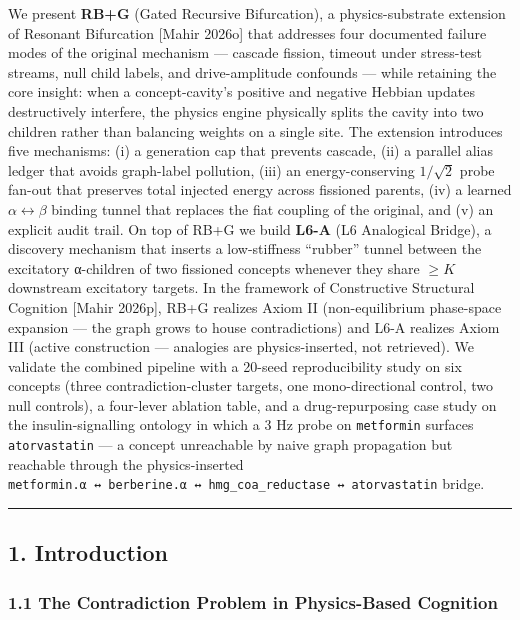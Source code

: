 \documentclass[
  11pt,
  a4paper,
]{article}
\begin{document}
We present \textbf{RB+G} (Gated Recursive Bifurcation), a
physics-substrate extension of Resonant Bifurcation {[}Mahir 2026o{]}
that addresses four documented failure modes of the original mechanism
--- cascade fission, timeout under stress-test streams, null child
labels, and drive-amplitude confounds --- while retaining the core
insight: when a concept-cavity's positive and negative Hebbian updates
destructively interfere, the physics engine physically splits the cavity
into two children rather than balancing weights on a single site. The
extension introduces five mechanisms: (i) a generation cap that prevents
cascade, (ii) a parallel alias ledger that avoids graph-label pollution,
(iii) an energy-conserving \(1/\sqrt{2}\) probe fan-out that preserves
total injected energy across fissioned parents, (iv) a learned
\(\alpha \leftrightarrow \beta\) binding tunnel that replaces the fiat
coupling of the original, and (v) an explicit audit trail. On top of
RB+G we build \textbf{L6-A} (L6 Analogical Bridge), a discovery
mechanism that inserts a low-stiffness ``rubber'' tunnel between the
excitatory α-children of two fissioned concepts whenever they share
\(\geq K\) downstream excitatory targets. In the framework of
Constructive Structural Cognition {[}Mahir 2026p{]}, RB+G realizes Axiom
II (non-equilibrium phase-space expansion --- the graph grows to house
contradictions) and L6-A realizes Axiom III (active construction ---
analogies are physics-inserted, not retrieved). We validate the combined
pipeline with a 20-seed reproducibility study on six concepts (three
contradiction-cluster targets, one mono-directional control, two null
controls), a four-lever ablation table, and a drug-repurposing case
study on the insulin-signalling ontology in which a 3 Hz probe on
\texttt{metformin} surfaces \texttt{atorvastatin} --- a concept
unreachable by naive graph propagation but reachable through the
physics-inserted
\texttt{metformin.α\ ↔\ berberine.α\ ↔\ hmg\_coa\_reductase\ ↔\ atorvastatin}
bridge.

\begin{center}\rule{0.5\linewidth}{0.5pt}\end{center}

\subsection{1. Introduction}\label{introduction}

\subsubsection{1.1 The Contradiction Problem in Physics-Based
Cognition}\label{the-contradiction-problem-in-physics-based-cognition}
\end{document}
